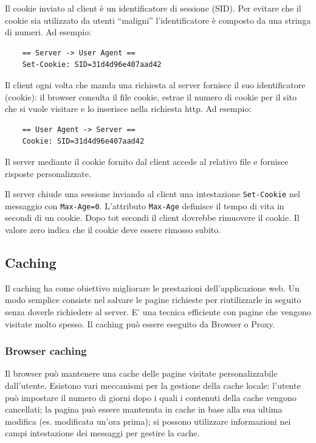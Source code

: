 Il cookie inviato al client è un identificatore di sessione (SID). Per evitare che il cookie sia utilizzato da utenti “maligni” l'identificatore è composto da una stringa di numeri. Ad esempio:

\begin{lstlisting}
    == Server -> User Agent ==
    Set-Cookie: SID=31d4d96e407aad42
\end{lstlisting}

Il client ogni volta che manda una richiesta al server fornisce il suo identificatore (cookie): il browser consulta il file cookie, estrae il numero di cookie per il sito che si vuole visitare e lo inserisce nella richiesta http. Ad esempio:
\begin{lstlisting}
    == User Agent -> Server ==
    Cookie: SID=31d4d96e407aad42
\end{lstlisting}

Il server mediante il cookie fornito dal client accede al relativo file e fornisce risposte personalizzate.

Il server chiude una sessione inviando al client una intestazione \verb|Set-Cookie| nel messaggio con
\verb|Max-Age=0|. L'attributo \verb|Max-Age| definisce il tempo di vita in secondi di un cookie. Dopo tot secondi il client dovrebbe rimuovere il cookie. Il valore zero indica che il cookie deve essere rimosso subito.

\subsection{Caching}
Il caching ha come obiettivo migliorare le prestazioni dell'applicazione web. Un modo semplice consiste nel salvare le pagine richieste per riutilizzarle in seguito senza doverle richiedere al server. E' una tecnica efficiente con pagine che vengono visitate molto spesso. Il caching può essere eseguito da Browser o Proxy.

\subsubsection{Browser caching}
Il browser può mantenere una cache delle pagine visitate personalizzabile dall'utente. Esistono vari meccanismi per la gestione della cache locale: l'utente può impostare il numero di giorni dopo i quali i contenuti della cache vengono cancellati; la pagina può essere mantenuta in cache in base alla sua ultima modifica (es. modificata un'ora prima); si possono utilizzare informazioni nei campi intestazione dei messaggi per gestire la cache.

